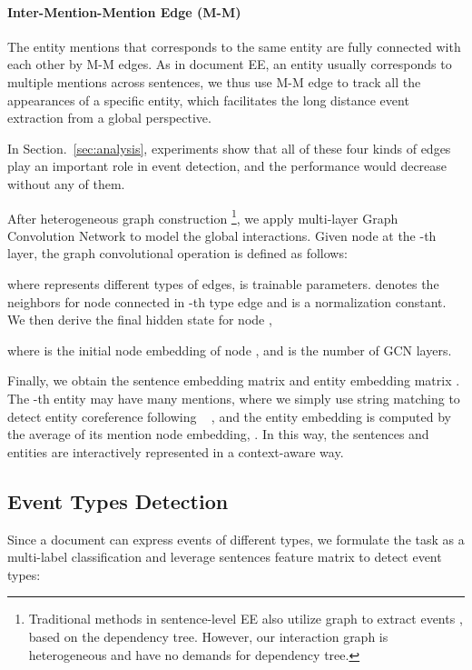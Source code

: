\documentclass[11pt,a4paper]{article}
\begin{document}
    \paragraph{Inter-Mention-Mention Edge (M-M)}The entity mentions that corresponds to the same entity are fully connected with each other by M-M edges. 
    As in document EE, an entity usually corresponds to multiple mentions across sentences, we thus use M-M edge to track all the appearances of a specific entity, which facilitates the long distance event extraction from a global perspective. 

In Section.~\ref{sec:analysis}, experiments show that all of these four kinds of edges play an important role in event detection, and the performance would decrease without any of them.

After heterogeneous graph construction 
\footnote{Traditional methods in sentence-level EE also utilize graph to extract events \citep{liu-etal-2018-jointly, yan-etal-2019-event}, based on the dependency tree.
However, our interaction graph is heterogeneous and have no demands for dependency tree.
}, 
we apply multi-layer Graph Convolution Network \citep{kipf2017semi} to model the global interactions. 
Given node  at the -th layer, the graph convolutional operation is defined as follows:

where  represents different types of edges,  is trainable parameters.
 denotes the neighbors for node  connected in -th type edge and  is a normalization constant.
We then derive the final hidden state  for node ,

where  is the initial node embedding of node , and  is the number of GCN layers.

Finally, we obtain the sentence embedding matrix  and entity embedding matrix . 
The -th entity may have many mentions, where we simply use string matching to detect entity coreference following ~\citet{zheng-etal-2019-doc2edag}
, and the entity embedding  is computed by the average of its mention node embedding, .
In this way, the sentences and entities are interactively represented in a context-aware way.

\subsection{Event Types Detection}
\label{sec:detect_events}
Since a document can express events of different types, we formulate the task as a multi-label classification and leverage sentences feature matrix  to detect event types:
\end{document}
